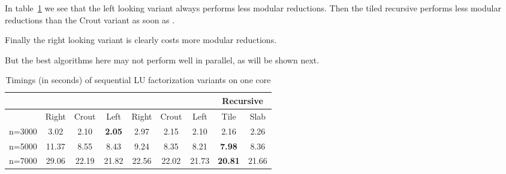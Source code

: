 \documentclass{article}
\begin{document}
 
 
 
 
 
 
 
 
 
 
 
 
 
 
 
 
 
 
 
In table~\ref{tab:overhead} we see that the left looking variant always performs less modular reductions. 
Then the tiled recursive performs less modular reductions than the Crout variant
as soon as . 
 
 
Finally the right looking variant is clearly costs more modular reductions.
 
But the best algorithms here may not perform well in parallel, as will be shown next.
 
 
 
 
 
 
 
 
 


\begin{table}[htbp] 
\begin{center}
 
\renewcommand{\arraystretch}{1.2}
\begin{tabular}{l|ccc|ccc|cc}
\toprule
  & \multicolumn{3}{c}{} & \multicolumn{3}{c}{} & \multicolumn{2}{c}{Recursive}\\
\midrule
   & Right & Crout & Left       & Right & Crout & Left   & Tile & Slab\\
\midrule
n=3000 & \multicolumn{1}{c}{3.02} & 2.10 & \textbf{2.05}  & \multicolumn{1}{c}{2.97} & 2.15 & 2.10  & \multicolumn{1}{c}{2.16} &
2.26\\
\midrule
n=5000 & \multicolumn{1}{c}{11.37} & 8.55 & 8.43  & \multicolumn{1}{c}{9.24} & 8.35 & 8.21  &\multicolumn{1}{c}{\textbf{7.98}} &
8.36\\
\midrule
n=7000 & \multicolumn{1}{c}{29.06} & 22.19 & 21.82  & \multicolumn{1}{c}{22.56} & 22.02 & 21.73  & \multicolumn{1}{c}{\textbf{20.81}} & 21.66\\
\bottomrule
\end{tabular}
\end{center}
\caption{Timings (in seconds) of sequential LU factorization variants on one core}  
\label{tab:overhead} \vspace{-20pt}
\end{table}
 
 
 
\end{document}
